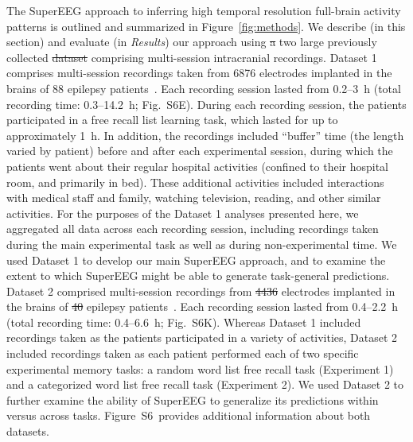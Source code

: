 \documentclass[10pt]{article}
\newcommand{\suppstats}{S6} %
\providecommand{\DIFaddtex}[1]{{\protect\color{blue}\uwave{#1}}} %
\providecommand{\DIFdeltex}[1]{{\protect\color{red}\sout{#1}}}                      %
\providecommand{\DIFaddbegin}{} %
\providecommand{\DIFaddend}{} %
\providecommand{\DIFdelbegin}{} %
\providecommand{\DIFdelend}{} %
\providecommand{\DIFadd}[1]{\texorpdfstring{\DIFaddtex{#1}}{#1}} %
\providecommand{\DIFdel}[1]{\texorpdfstring{\DIFdeltex{#1}}{}} %
\newcommand{\DIFscaledelfig}{0.5}
\newlength{\DIFdelgraphicswidth} %
\newlength{\DIFdelgraphicsheight} %
\newcommand{\DIFaddincludegraphics}[2][]{{\color{blue}\fbox{\DIFOincludegraphics[#1]{#2}}}} %
\newcommand{\DIFdelincludegraphics}[2][]{%
\sbox{\DIFdelgraphicsbox}{\DIFOincludegraphics[#1]{#2}}%
\settoboxwidth{\DIFdelgraphicswidth}{\DIFdelgraphicsbox} %
\settoboxtotalheight{\DIFdelgraphicsheight}{\DIFdelgraphicsbox} %
\scalebox{\DIFscaledelfig}{%
\parbox[b]{\DIFdelgraphicswidth}{\usebox{\DIFdelgraphicsbox}\\[-\baselineskip] \rule{\DIFdelgraphicswidth}{0em}}\llap{\resizebox{\DIFdelgraphicswidth}{\DIFdelgraphicsheight}{%
\setlength{\unitlength}{\DIFdelgraphicswidth}%
\begin{picture}(1,1)%
\thicklines\linethickness{2pt} %
{\color[rgb]{1,0,0}\put(0,0){\framebox(1,1){}}}%
{\color[rgb]{1,0,0}\put(0,0){\line( 1,1){1}}}%
{\color[rgb]{1,0,0}\put(0,1){\line(1,-1){1}}}%
\end{picture}%
}\hspace*{3pt}}} %
} %
\DeclareRobustCommand{\DIFaddbegin}{\DIFOaddbegin \let\includegraphics\DIFaddincludegraphics} %
\DeclareRobustCommand{\DIFaddend}{\DIFOaddend \let\includegraphics\DIFOincludegraphics} %
\DeclareRobustCommand{\DIFdelbegin}{\DIFOdelbegin \let\includegraphics\DIFdelincludegraphics} %
\DeclareRobustCommand{\DIFdelend}{\DIFOaddend \let\includegraphics\DIFOincludegraphics} %
\begin{document}
\DIFaddend The SuperEEG approach to inferring high temporal resolution full-brain activity
patterns is outlined and summarized in Figure~\ref{fig:methods}. We describe (in
this section) and evaluate (in \textit{Results}) our approach using \DIFdelbegin \DIFdel{a }\DIFdelend two large
previously collected \DIFdelbegin \DIFdel{dataset }\DIFdelend \DIFaddbegin \DIFadd{datasets }\DIFaddend comprising multi-session intracranial recordings.
Dataset 1 comprises multi-session recordings taken from 6876 electrodes
implanted in the brains of 88 epilepsy patients~\citep{SedeEtal03, SedeEtal07a,
SedeEtal07b, MannEtal11, MannEtal12}.  Each recording session lasted from
0.2--3~h (total recording time: 0.3--14.2~h; Fig.~\suppstats E).  During each
recording session, the patients participated in a free recall list learning
task, which lasted for up to approximately 1~h.  In addition, the recordings
included ``buffer'' time (the length varied by patient) before and after each
experimental session, during which the patients went about their regular
hospital activities (confined to their hospital room, and primarily in bed).
These additional activities included interactions with medical staff and family,
watching television, reading, and other similar activities.  For the purposes of
the Dataset 1 analyses presented here, we aggregated all data across each
recording session, including recordings taken during the main experimental task
as well as during non-experimental time.  We used Dataset 1 to develop our main
SuperEEG approach, and to examine the extent to which SuperEEG might be able to
generate task-general predictions.  Dataset 2 comprised multi-session recordings
from \DIFdelbegin \DIFdel{4436
}\DIFdelend \DIFaddbegin \DIFadd{14860 }\DIFaddend electrodes implanted in the brains of \DIFdelbegin \DIFdel{40 }\DIFdelend \DIFaddbegin \DIFadd{131 }\DIFaddend epilepsy
patients~\citep{EzzyEtal17, HoraEtal17, KragEtal17, KuceEtal17, LinEtal17,
SoloEtal18, WeidEtal18, EzzyEtal18, KuceEtal18}.  Each recording session lasted
from 0.4--2.2~h (total recording time: 0.4--6.6~h; Fig.~\suppstats K).  Whereas
Dataset 1 included recordings taken as the patients participated in a variety of
activities, Dataset 2 included recordings taken as each patient performed each
of two specific experimental memory tasks: a random word list free recall task
(Experiment 1) and a categorized word list free recall task (Experiment 2).  We
used Dataset 2 to further examine the ability of SuperEEG to generalize its
predictions within versus across tasks.  Figure~\suppstats~provides additional
information about both datasets.
\end{document}
